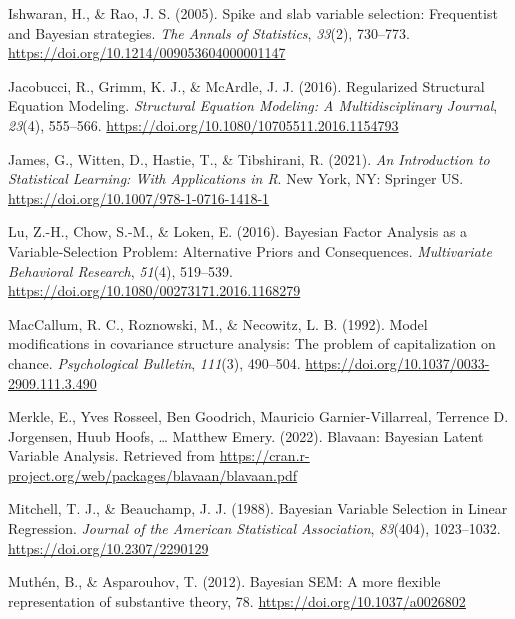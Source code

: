 \documentclass[
  man, donotrepeattitle,floatsintext]{apa6}
\newlength{\cslhangindent}
\newlength{\cslentryspacingunit} %
\newenvironment{CSLReferences}[2] %
 {%
  \setlength{\parindent}{0pt}
  \ifodd #1
  \let\oldpar\par
  \def\par{\hangindent=\cslhangindent\oldpar}
  \fi
  \setlength{\parskip}{#2\cslentryspacingunit}
 }%
 {}
\begin{document}
\begin{CSLReferences}{1}{0}
\leavevmode{}%
Ishwaran, H., \& Rao, J. S. (2005). Spike and slab variable selection: {Frequentist} and {Bayesian} strategies. \emph{The Annals of Statistics}, \emph{33}(2), 730--773. \url{https://doi.org/10.1214/009053604000001147}

\leavevmode{}%
Jacobucci, R., Grimm, K. J., \& McArdle, J. J. (2016). Regularized {Structural} {Equation} {Modeling}. \emph{Structural Equation Modeling: A Multidisciplinary Journal}, \emph{23}(4), 555--566. \url{https://doi.org/10.1080/10705511.2016.1154793}

\leavevmode{}%
James, G., Witten, D., Hastie, T., \& Tibshirani, R. (2021). \emph{An {Introduction} to {Statistical} {Learning}: With {Applications} in {R}}. New York, NY: Springer US. \url{https://doi.org/10.1007/978-1-0716-1418-1}

\leavevmode{}%
Lu, Z.-H., Chow, S.-M., \& Loken, E. (2016). Bayesian {Factor} {Analysis} as a {Variable}-{Selection} {Problem}: {Alternative} {Priors} and {Consequences}. \emph{Multivariate Behavioral Research}, \emph{51}(4), 519--539. \url{https://doi.org/10.1080/00273171.2016.1168279}

\leavevmode{}%
MacCallum, R. C., Roznowski, M., \& Necowitz, L. B. (1992). Model modifications in covariance structure analysis: The problem of capitalization on chance. \emph{Psychological Bulletin}, \emph{111}(3), 490--504. \url{https://doi.org/10.1037/0033-2909.111.3.490}

\leavevmode{}%
Merkle, E., Yves Rosseel, Ben Goodrich, Mauricio Garnier-Villarreal, Terrence D. Jorgensen, Huub Hoofs, \ldots{} Matthew Emery. (2022). Blavaan: {Bayesian} {Latent} {Variable} {Analysis}. Retrieved from \url{https://cran.r-project.org/web/packages/blavaan/blavaan.pdf}

\leavevmode{}%
Mitchell, T. J., \& Beauchamp, J. J. (1988). Bayesian {Variable} {Selection} in {Linear} {Regression}. \emph{Journal of the American Statistical Association}, \emph{83}(404), 1023--1032. \url{https://doi.org/10.2307/2290129}

\leavevmode{}%
Muthén, B., \& Asparouhov, T. (2012). Bayesian {SEM}: {A} more ﬂexible representation of substantive theory, 78. \url{https://doi.org/10.1037/a0026802}


\end{CSLReferences}
\end{document}
